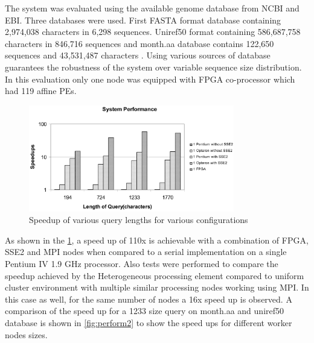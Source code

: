 \documentclass[12pt,twoside]{article}
\begin{document}
The system was evaluated using the available genome database from NCBI and EBI. Three databases were used. First FASTA format database
containing 2,974,038 characters in 6,298 sequences. Uniref50 format containing 586,687,758 characters in
846,716 sequences and month.aa database contains 122,650 sequences and 43,531,487 characters  \cite{meng_high-performance_2010}.
Using various sources of database guarantees
the robustness of the system over variable sequence size distribution. In this evaluation only one node was equipped with FPGA co-processor
which had 119 affine PEs.
\begin{figure}[h]%
    \centering
    \includegraphics[width=0.8\textwidth]{fig/perform1}
    \caption{Speedup of various query lengths for various configurations \cite[Figure 10]{meng_high-performance_2010}}
    \label{fig:perform1}
\end{figure}
As shown in the \cref{fig:perform1}, a speed up of 110x is achievable with a combination of FPGA, SSE2 and MPI nodes when compared
to a serial implementation on a single Pentium IV 1.9 GHz processor. Also tests were performed to compare the speedup achieved by the 
Heterogeneous processing element compared to uniform cluster environment with multiple similar processing nodes working using MPI.
In this case as well, for the same number of nodes a 16x speed up is observed. A comparison of the speed up for a 1233 size query on month.aa and 
uniref50 database is shown in \cref{fig:perform2} to show the speed ups for different worker nodes sizes.
\end{document}
